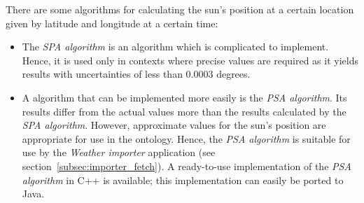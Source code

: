 There are some algorithms for calculating the sun's position at a certain location given by latitude and longitude at a certain time:

\begin{itemize}
  \item The \emph{SPA algorithm}\cite{SPA_algorithm} is an algorithm which is complicated to implement. Hence, it is used only in contexts where precise values are required as it yields results with uncertainties of less than \num{0.0003} degrees.
  
  \item A algorithm that can be implemented more easily is the \emph{PSA algorithm}\cite{PSA_algorithm}. Its results differ from the actual values more than the results calculated by the \emph{SPA algorithm}. However, approximate values for the sun's position are appropriate for use in the \thinkhomeweather ontology. Hence, the \emph{PSA algorithm} is suitable for use by the \emph{Weather importer} application (see section~\ref{subsec:importer_fetch}). A ready-to-use implementation of the \emph{PSA algorithm} in C++ is available; this implementation can easily be ported to Java.
\end{itemize}
